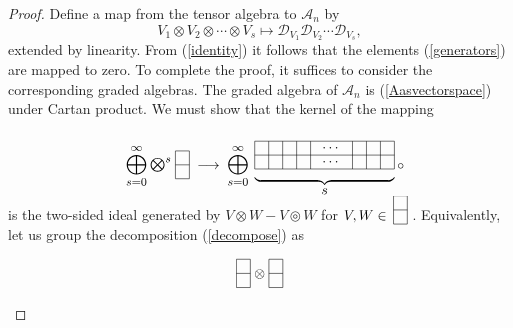 \documentclass[a4paper,12pt]{amsart}
\newcommand{\topten}{\circledcirc}
\begin{document}
\renewcommand{\proofname}{Proof of Theorem~\ref{structure}}\begin{proof}
Define a map from the tensor algebra to ${\mathcal A}_n$ by
$$V_1\otimes V_2\otimes\cdots\otimes V_s\longmapsto
{\mathcal D}_{V_1}{\mathcal D}_{V_2}\cdots{\mathcal D}_{V_s},$$
extended by linearity. {From} (\ref{identity}) it follows that the
elements (\ref{generators}) are mapped to zero. To complete the proof, it
suffices to consider the corresponding graded algebras. The graded algebra of
${\mathcal A}_n$ is (\ref{Aasvectorspace}) under Cartan product. We must show
that the kernel of the mapping
\begin{equation}\label{proj}
\raisebox{5pt}{$\mbox{\large$\displaystyle \bigoplus_{s=0}^\infty
\textstyle\bigotimes^s$}\;
\begin{picture}(10,30)(0,12)
\put(0,5){\line(1,0){10}}
\put(0,15){\line(1,0){10}}
\put(0,25){\line(1,0){10}}
\put(0,5){\line(0,1){20}}
\put(10,5){\line(0,1){20}}
\end{picture}
\;\longrightarrow\;
\mbox{\large$\displaystyle \bigoplus_{s=0}^\infty$}$}\;
\underbrace{\begin{picture}(100,30)
\put(0,5){\line(1,0){100}}
\put(0,15){\line(1,0){100}}
\put(0,25){\line(1,0){100}}
\put(0,5){\line(0,1){20}}
\put(10,5){\line(0,1){20}}
\put(20,5){\line(0,1){20}}
\put(30,5){\line(0,1){20}}
\put(40,5){\line(0,1){20}}
\put(70,5){\line(0,1){20}}
\put(80,5){\line(0,1){20}}
\put(90,5){\line(0,1){20}}
\put(100,5){\line(0,1){20}}
\put(55,10){\makebox(0,0){$\cdots$}}
\put(55,20){\makebox(0,0){$\cdots$}}
\put(102,7){\makebox(0,0)[l]{$\circ$}}
\end{picture}}_{\mbox{$s$}}\end{equation}
is the two-sided ideal generated by $V\otimes W-V\topten W$ for
$V,W\in\:
\begin{picture}(10,10)(0,8)
\put(0,5){\line(1,0){10}}
\put(0,15){\line(1,0){10}}
\put(0,25){\line(1,0){10}}
\put(0,5){\line(0,1){20}}
\put(10,5){\line(0,1){20}}
\end{picture}\;$.
Equivalently, let us group the decomposition (\ref{decompose}) as
$$\begin{picture}(10,30)
\put(0,5){\line(1,0){10}}
\put(0,15){\line(1,0){10}}
\put(0,25){\line(1,0){10}}
\put(0,5){\line(0,1){20}}
\put(10,5){\line(0,1){20}}
\end{picture}
\raisebox{12pt}{$\;\otimes\;$}
\begin{picture}(10,30)
\put(0,5){\line(1,0){10}}
\put(0,15){\line(1,0){10}}
\put(0,25){\line(1,0){10}}
\put(0,5){\line(0,1){20}}
\put(10,5){\line(0,1){20}}

\end{picture}$$
\end{proof}
\end{document}

